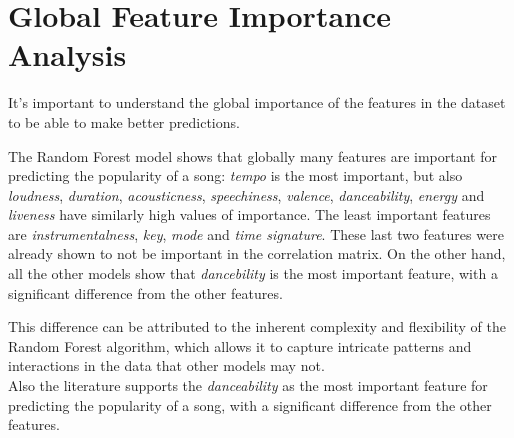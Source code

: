 \section{Global Feature Importance Analysis}

It's important to understand the global importance of the features in the dataset to be able to make better predictions.

The Random Forest model shows that globally many features are important for predicting the popularity of a song: \textit{tempo} is the most important, but also \textit{loudness}, \textit{duration}, \textit{acousticness}, \textit{speechiness}, \textit{valence}, \textit{danceability}, \textit{energy} and \textit{liveness} have similarly high values of importance. The least important features are \textit{instrumentalness}, \textit{key}, \textit{mode} and \textit{time signature}. These last two features were already shown to not be important in the correlation matrix.
On the other hand, all the other models show that 
\textit{dancebility} is the most important feature, with a significant difference from the other features.

This difference can be attributed to the inherent complexity and flexibility of the Random Forest
algorithm, which allows it to capture intricate patterns and interactions in the data that other models may not.\\
Also the literature supports the \textit{danceability} as the most important feature for predicting the popularity of a song, with a significant difference from the other features.\\




